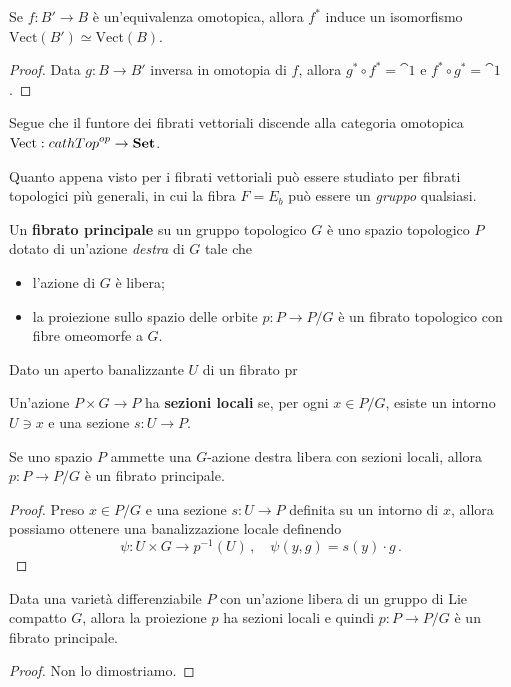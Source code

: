\begin{cor}
	Se $f:B' \to B$ è un'equivalenza omotopica, allora $f^{*}$ 
	induce un isomorfismo $\mathrm{Vect}(B') \simeq \mathrm{Vect}(B)$.
	\begin{proof}
		Data $g:B \to B'$ inversa in omotopia di $f$, allora
		$g^{*} \circ f^{*} = \cat{1}$ e $f^* \circ g^{*} = \cat{1}$.
	\end{proof}
\end{cor}

Segue che il funtore dei fibrati vettoriali
discende alla categoria omotopica $\mathrm{Vect}:cat{hTop}^{op} \to {\normalfont\textbf{Set}}$.

Quanto appena visto per i fibrati vettoriali può essere studiato
per fibrati topologici più generali, in cui la fibra $F = E_{b}$ può essere un \emph{gruppo}
qualsiasi.

\begin{df}
	Un \textbf{fibrato principale} su un gruppo topologico $G$ è uno spazio topologico $P$
	dotato di un'azione \emph{destra} di $G$ tale che
	\begin{itemize}
		\item l'azione di $G$ è libera;
		\item la proiezione sullo spazio delle orbite $p: P \to P/G$
		è un fibrato topologico con fibre omeomorfe a $G$.
	\end{itemize}
\end{df}

Dato un aperto banalizzante $U$ di un fibrato pr

\begin{df}
	Un'azione $P \times G \to P$ ha \textbf{sezioni locali} se, per ogni $x \in P/G$,
	esiste un intorno $U \ni x$ e una sezione $s:U \to P$.
\end{df}

\begin{prop}
	Se uno spazio $P$ ammette una $G$-azione destra libera con sezioni locali,
	allora $p:P \to P/G$ è un fibrato principale.
	\begin{proof}
		Preso $x \in P/G$ e una sezione $s:U \to P$ definita su un intorno di $x$,
		allora possiamo ottenere una banalizzazione locale definendo
		\begin{equation*}
			\psi : U \times G \longrightarrow p^{-1}(U)\,, \quad
			\psi(y,g) = s(y) \cdot g\,.
		\end{equation*}
	\end{proof}
\end{prop}

\begin{thm}
	Data una varietà differenziabile $P$ con un'azione libera di un gruppo di Lie compatto $G$,
	allora la proiezione $p$ ha sezioni locali e quindi $p:P \to P/G$ è un fibrato principale.
	\begin{proof}
		Non lo dimostriamo.
	\end{proof}
\end{thm}

